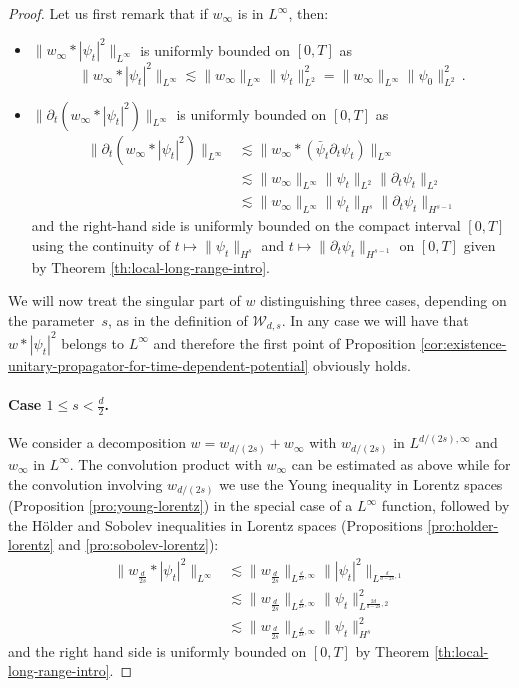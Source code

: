 \documentclass[12pt]{article}
\theoremstyle{plain}
\newcommand{\setW}{{\mathcal{W}_{d,s}}}
\begin{document}
\begin{proof}
   Let us first remark that if $w_\infty$ is in $L^\infty$, then:
   \begin{itemize}
       \item $\|w_\infty*|\psi_t|^2\|_{L^\infty}$ is uniformly bounded on $[0,T]$ as
   \begin{equation}
       \|w_\infty*|\psi_t|^2\|_{L^\infty} 
        \lesssim \|w_\infty\|_{L^\infty}  \|\psi_t\|_{L^2}^2=\|w_\infty\|_{L^\infty}  \|\psi_0\|_{L^2}^2\,.
    \end{equation}
        \item $\|\partial_t(w_\infty*|\psi_t|^2)\|_{L^\infty}$ is uniformly bounded on $[0,T]$ as
   \begin{align*}
       \|\partial_t(w_\infty*|\psi_t|^2)\|_{L^\infty} 
       &\lesssim \|w_\infty*(\bar\psi_t \partial_t\psi_t)\|_{L^\infty} \\
       & \lesssim \|w_\infty\|_{L^\infty} \|\psi_t\|_{L^2} \|\partial_t\psi_t\|_{L^2} \\
       & \lesssim \|w_\infty\|_{L^\infty} \|\psi_t\|_{H^s} \|\partial_t\psi_t\|_{H^{s-1}}
   \end{align*}
   and the right-hand side is uniformly bounded on the compact interval $[0,T]$ using the continuity of $t\mapsto\|\psi_t\|_{H^s}$ and $t\mapsto\|\partial_t\psi_t\|_{H^{s-1}}$ on $[0,T]$ given by Theorem \ref{th:local-long-range-intro}.
   \end{itemize}
   
   We will now treat the singular part of $w$ distinguishing three cases, depending on  the parameter~$s$, as in the definition of $\setW$. In any case we will have that $w*|\psi_t|^2$ belongs to $L^\infty$ and therefore the first point of Proposition \ref{cor:existence-unitary-propagator-for-time-dependent-potential} obviously holds. 
   
   \paragraph{Case $1\leq s< \frac{d}{2}$.}
   We consider a decomposition $w=w_{d/(2s)}+w_\infty$ with $w_{d/(2s)}$ in $L^{d/(2s),\infty}$ and $w_\infty$ in $L^\infty$. The convolution product with $w_\infty$ can be estimated as above while for the convolution involving $w_{d/(2s)}$ we use the Young inequality in Lorentz spaces (Proposition \ref{pro:young-lorentz}) in the special case of a $L^\infty$ function, followed by the Hölder and Sobolev inequalities in Lorentz spaces (Propositions \ref{pro:holder-lorentz} and \ref{pro:sobolev-lorentz}):
   \begin{align*}
       \|w_{\frac{d}{2s}}*|\psi_t|^2\|_{L^{\infty}} 
        &\lesssim \|w_{\frac{d}{2s}}\|_{L^{\frac{d}{2s},\infty}} \| |\psi_t|^2 \|_{L^{\frac{d}{d-2s},1}} \\
        &\lesssim \|w_{\frac{d}{2s}}\|_{L^{\frac{d}{2s},\infty}} \|\psi_t\|_{L^{\frac{2d}{d-2s},2}}^2 \\
        &\lesssim \|w_{\frac{d}{2s}}\|_{L^{\frac{d}{2s},\infty}} \|\psi_t\|_{H^s}^2
   \end{align*}  
   and the right hand side is uniformly bounded on $[0,T]$ by Theorem \ref{th:local-long-range-intro}.
  


\end{proof}
\end{document}
